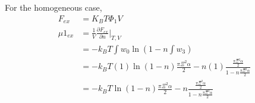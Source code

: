 \documentclass[double,12pt]{revtex4-2}
\begin{document}
For the homogeneous case,
\begin{align}
    F_{ex} &= K_BT\Phi_1 V\\
 \mu1_{ex} &= \frac{1}{V}\frac{\partial F_{ex}}{\partial n} \bigg|_{T,V}\\
           &= -k_BT\int w_0 \ln(1-n \int w_3)  \\
           &= - k_BT(1)\ln(1-n)\frac{\pi\Xi^2\alpha}{2} -n(1)\frac{\frac{\pi\Xi^2\alpha}{2}}{1-n\frac{\pi\Xi^2\alpha}{2}} \\
           &= - k_BT\ln(1-n)\frac{\pi\Xi^2\alpha}{2} -n\frac{\frac{\pi\Xi^2\alpha}{2}}{1-n\frac{\pi\Xi^2\alpha}{2}}
\end{align}
\end{document}
